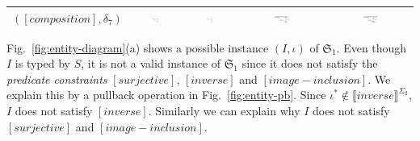 \documentclass{eceasst}
\begin{document}
\begin{table}[h]
\begin{center}
\begin{tabular}{| l | c | c | c | c | }
    $([composition], \delta_7)$ 		  & \includegraphics[width=0.13\textwidth]{comp-L.pdf} & \includegraphics[width=0.13\textwidth]{comp-R.pdf} & 
				    \includegraphics[width=0.19\textwidth]{comp-L-delta.pdf} & \includegraphics[width=0.19\textwidth]{comp-R-delta.pdf} \\ 
    \hline    
    \end{tabular}
    \end{center}
\end{table}
\normalsize



Fig.~\ref{fig:entity-diagram}(a) shows a possible instance $(I, \iota)$ of $\mathfrak{S}_1$. 
Even though $I$ is typed by $S$, it is not a valid instance of $\mathfrak{S}_1$ since it does not satisfy the \textit{predicate constraints} $[surjective]$, $[inverse]$ and $[image-inclusion]$. 
We explain this by a pullback operation in Fig.~\ref{fig:entity-pb}. Since $\iota^* \notin \llbracket inverse \rrbracket^{\Sigma_2}$, $I$ does not satisfy $[inverse]$. 
Similarly we can explain why $I$ does not satisfy $[surjective]$ and $[image-inclusion]$. 
\end{document}
